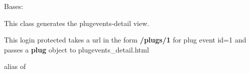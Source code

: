 \documentclass[letterpaper,10pt,english]{sphinxmanual}
\begin{document}
\begin{fulllineitems}
\label{api:mousedb.timed_mating.views.PlugEventsDetail}
Bases: {\hyperref[api:mousedb.views.ProtectedDetailView]{}}

This class generates the plugevents-detail view.

This login protected takes a url in the form \textbf{/plugs/1} for plug event id=1 and passes a \textbf{plug} object to plugevents\_detail.html

\begin{fulllineitems}
\label{api:mousedb.timed_mating.views.PlugEventsDetail.context_object_name}
\end{fulllineitems}


\begin{fulllineitems}
\label{api:mousedb.timed_mating.views.PlugEventsDetail.model}
alias of 

\end{fulllineitems}


\begin{fulllineitems}
\label{api:mousedb.timed_mating.views.PlugEventsDetail.template_name}
\end{fulllineitems}


\end{fulllineitems}

\end{document}
